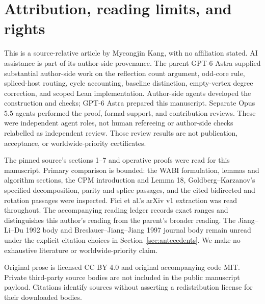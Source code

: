 \section{Attribution, reading limits, and rights}\label{app:attribution}
This is a source-relative article by Myeongjin Kang, with no affiliation
stated. AI assistance is part of its author-side provenance. The parent
GPT-6 Astra supplied substantial author-side work on the reflection
count argument, odd-core rule, spliced-host routing, cycle accounting,
baseline distinction, empty-vertex degree correction, and scoped Lean
implementation. Author-side agents developed the construction and
checks; GPT-6 Astra prepared this manuscript. Separate Opus 5.5 agents
performed the proof, formal-support, and contribution reviews. These
were independent agent roles, not human refereeing or author-side
checks relabelled as independent review. Those review results are not
publication, acceptance, or worldwide-priority certificates.

The pinned source's sections 1--7 and operative proofs were read for
this manuscript. Primary comparison is bounded: the WABI formulation,
lemmas and algorithm sections, the CPM introduction and Lemma 18,
Goldberg--Karzanov's specified decomposition, parity and splice passages,
and the cited bidirected and rotation passages were inspected.
Fici et al.'s arXiv v1 extraction was read throughout. The accompanying
reading ledger records exact ranges and distinguishes this author's
reading from the parent's broader reading. The Jiang--Li--Du 1992
body and Breslauer--Jiang--Jiang 1997 journal body remain unread under
the explicit citation choices in Section~\ref{sec:antecedents}. We make no
exhaustive literature or worldwide-priority claim.

Original prose is licensed CC BY 4.0 and original accompanying code MIT.
Private third-party source bodies are not included in the public
manuscript payload. Citations identify sources without asserting a
redistribution license for their downloaded bodies.
